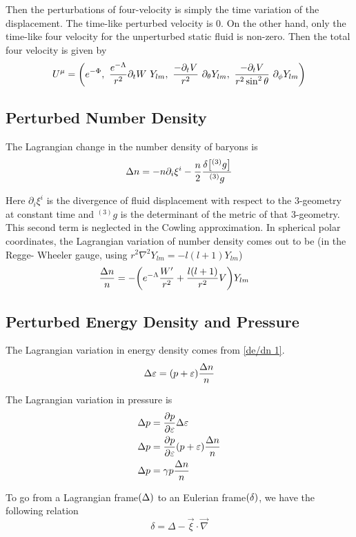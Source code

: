 \documentclass[12pt, letterpaper]{report}
\begin{document}
Then the perturbations of four-velocity is simply the time variation of the displacement. The time-like perturbed velocity is $0$. On the other hand, only the time-like four velocity for the unperturbed static fluid is non-zero. Then the total four velocity is given by
\begin{equation}
    U^\mu= \qty(e^{-\Phi},\ \frac{e^{-\Lambda}}{r^2}\partial_t W\ Y_{lm},\ \frac{-\partial_t V}{r^2} \ \partial_\theta Y_{lm}, \ \frac{-\partial_tV}{r^2\sin^2\theta}\  \partial_\phi Y_{lm})
\end{equation}

\subsection{Perturbed Number Density}

The Lagrangian change in the number density of baryons is
$$\Delta n= -n \partial_i \xi^i -\frac{n}{2}\frac{\delta\qty[{}^{(3)}g]}{{}^{(3)}g}$$

Here $\partial_i \xi^i$ is the divergence of fluid displacement with respect to the 3-geometry at constant time and ${}^{(3)}g$ is the determinant of the metric of that 3-geometry. This second term is neglected in the Cowling approximation. In spherical polar coordinates, the Lagrangian variation of number density comes out to be (in the Regge- Wheeler gauge, using $r^2 \nabla^2 Y_{lm}= -l(l+1)Y_{lm}$)
\begin{align}
    \frac{\Delta n}{n}&= -\qty(e^{-\Lambda}\frac{W'}{r^2}+\frac{l(l+1)}{r^2}V)Y_{lm}\label{dn/n} 
\end{align} 

\subsection{Perturbed Energy Density and Pressure}

The Lagrangian variation in energy density comes from \cref{de/dn 1}. \[\Delta \varepsilon= \qty(p+\varepsilon)\frac{\Delta n}{n}\]

The Lagrangian variation in pressure is 
\begin{align*}
    \Delta p &= \pdv{p}{\varepsilon}\Delta \varepsilon\\
    \Delta p &= \pdv{p}{\varepsilon}\qty(p+\varepsilon)\frac{\Delta n}{n}\\
    \Delta p &= \gamma p\frac{\Delta n}{n}
\end{align*}

To go from a Lagrangian frame$\qty(\Delta)$ to an Eulerian frame$\qty(\delta)$, we have the following relation \[\delta= \Delta- \vec{\xi}\cdot \vec{\nabla}\]
\end{document}
